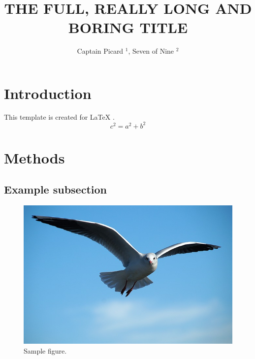 \documentclass[en]{prtclass}
\author{Captain Picard $^1$, Seven of Nine $^2$}
\title{THE FULL, REALLY LONG AND BORING TITLE}
\begin{document}
\maketitle

\section{Introduction}
This template is created for LaTeX \cite{lamport1986latex}.
\blindtext[2]
\begin{equation}
c^{2} = a^{2} + b^{2} 
\end{equation}
\blindtext[2]


\section{Methods}
\blindtext[1]
\subsection{Example subsection}
\blindtext[1]
\begin{figure}
    \centering
    \includegraphics[width = 0.8\linewidth]{figures/sample_figure.jpg}
    \caption{Sample figure.}
    \label{fig:results}
\end{figure}

\blindtext[1]
\end{document}
